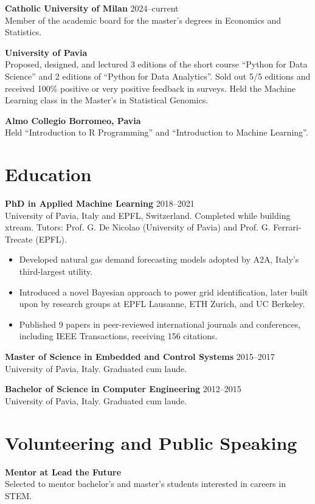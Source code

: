 \documentclass[10pt,a4paper]{article}
\begin{document}
\vspace{3pt}
\textbf{Catholic University of Milan} \hfill 2024--current\\
Member of the academic board for the master's degrees in Economics and Statistics.

\vspace{3pt}
\textbf{University of Pavia}\\
Proposed, designed, and lectured 3 editions of the short course ``Python for Data Science'' and 2 editions of ``Python for Data Analytics''. Sold out 5/5 editions and received 100\% positive or very positive feedback in surveys. Held the Machine Learning class in the Master's in Statistical Genomics.

\vspace{3pt}
\textbf{Almo Collegio Borromeo, Pavia}\\
Held ``Introduction to R Programming'' and ``Introduction to Machine Learning''.

\section*{Education}
\textbf{PhD in Applied Machine Learning} \hfill 2018--2021\\
University of Pavia, Italy and EPFL, Switzerland. Completed while building xtream. Tutors: Prof. G. De Nicolao (University of Pavia) and Prof. G. Ferrari-Trecate (EPFL).
\begin{itemize}
  \item Developed natural gas demand forecasting models adopted by A2A, Italy's third-largest utility.
  \item Introduced a novel Bayesian approach to power grid identification, later built upon by research groups at EPFL Lausanne, ETH Zurich, and UC Berkeley.
  \item Published 9 papers in peer-reviewed international journals and conferences, including IEEE Transactions, receiving 156 citations.
\end{itemize}

\textbf{Master of Science in Embedded and Control Systems} \hfill 2015--2017\\
University of Pavia, Italy. Graduated cum laude.

\vspace{3pt}
\textbf{Bachelor of Science in Computer Engineering} \hfill 2012--2015\\
University of Pavia, Italy. Graduated cum laude.

\section*{Volunteering and Public Speaking}
\textbf{Mentor at Lead the Future}\\
Selected to mentor bachelor's and master's students interested in careers in STEM.
\end{document}
